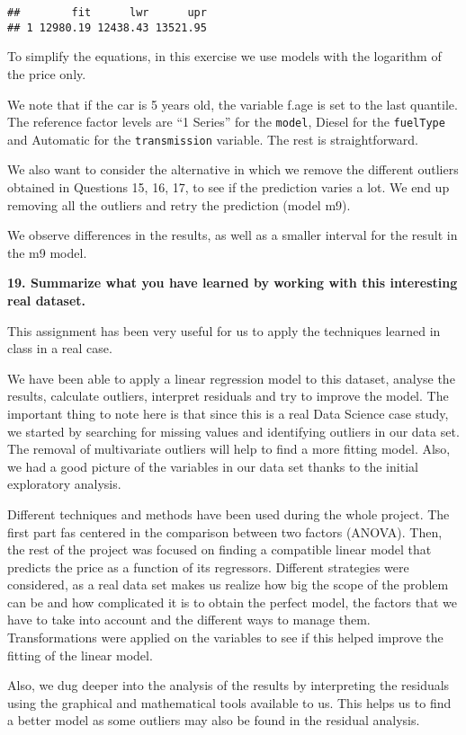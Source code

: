 \documentclass[
]{article}
\begin{document}
\begin{verbatim}
##        fit      lwr      upr
## 1 12980.19 12438.43 13521.95
\end{verbatim}

 To simplify the equations, in this exercise we use
models with the logarithm of the price only.

We note that if the car is 5 years old, the variable f.age is set to the
last quantile. The reference factor levels are ``1 Series'' for the
\texttt{model}, Diesel for the \texttt{fuelType} and Automatic for the
\texttt{transmission} variable. The rest is straightforward.

We also want to consider the alternative in which we remove the
different outliers obtained in Questions 15, 16, 17, to see if the
prediction varies a lot. We end up removing all the outliers and retry
the prediction (model m9).

We observe differences in the results, as well as a smaller interval for
the result in the m9 model.

\newpage

\textbf{19. Summarize what you have learned by working with this interesting real dataset.}

This assignment has been very useful for us to apply the techniques
learned in class in a real case.

We have been able to apply a linear regression model to this dataset,
analyse the results, calculate outliers, interpret residuals and try to
improve the model. The important thing to note here is that since this
is a real Data Science case study, we started by searching for missing
values and identifying outliers in our data set. The removal of
multivariate outliers will help to find a more fitting model. Also, we
had a good picture of the variables in our data set thanks to the
initial exploratory analysis.

Different techniques and methods have been used during the whole
project. The first part fas centered in the comparison between two
factors (ANOVA). Then, the rest of the project was focused on finding a
compatible linear model that predicts the price as a function of its
regressors. Different strategies were considered, as a real data set
makes us realize how big the scope of the problem can be and how
complicated it is to obtain the perfect model, the factors that we have
to take into account and the different ways to manage them.
Transformations were applied on the variables to see if this helped
improve the fitting of the linear model.

Also, we dug deeper into the analysis of the results by interpreting the
residuals using the graphical and mathematical tools available to us.
This helps us to find a better model as some outliers may also be found
in the residual analysis.
\end{document}
